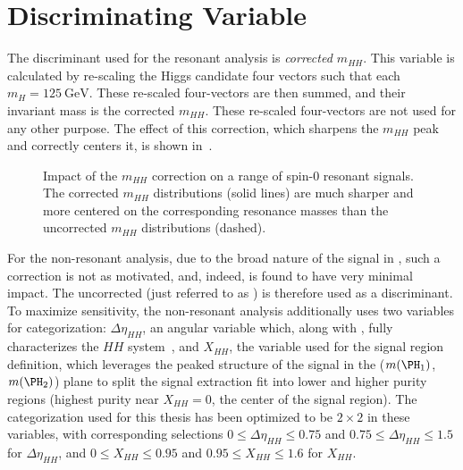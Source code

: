 \section{Discriminating Variable}
\label{subsec:disc-var}

The discriminant used for the resonant analysis is \emph{corrected $m_{HH}$}. This
variable is calculated by re-scaling the Higgs candidate four vectors such that
each $m_{H} = \SI{125}{\GeV}$. These re-scaled four-vectors are then summed, and
their invariant mass is the corrected $m_{HH}$. These re-scaled four-vectors are
not used for any other purpose. The effect of this correction, which sharpens
the $m_{HH}$ peak and correctly centers it, is shown
in~\Fig{\ref{fig:m-hh-cor-effect}}.
\begin{figure}[ht]
\centering
{}
\caption{\label{fig:m-hh-cor-effect} Impact of the $m_{HH}$ correction on a range of spin-0 
resonant signals. The corrected $m_{HH}$ distributions (solid lines) are much sharper and 
more centered on the corresponding resonance masses than the uncorrected $m_{HH}$ distributions 
(dashed).}
\end{figure}

For the non-resonant analysis, due to the broad nature of the signal in \mhh, such a 
correction is not as motivated, and, indeed, is found to have very minimal 
impact. The uncorrected \mhh (just referred to as \mhh) is therefore used 
as a discriminant. To maximize sensitivity, the non-resonant analysis 
additionally uses two variables for categorization: $\Delta \eta_{HH}$, an angular 
variable which, along with \mhh, fully characterizes the $HH$ system~\cite{cosThetastar}, 
and $X_{HH}$, the variable used for the 
signal region definition, which leverages the peaked structure of the 
signal in the ($\mh1$, $\mh2$) plane to split the signal extraction fit into lower and higher
purity regions (highest purity near $X_{HH} = 0$, the center of the signal region). The categorization 
used for this thesis has been optimized to be $2\times 2$ in these variables, with corresponding selections 
$0 \leq \Delta \eta_{HH} \leq 0.75$ and $0.75 \leq \Delta \eta_{HH} \leq 1.5$ for $\Delta \eta_{HH}$, 
and $0 \leq X_{HH} \leq 0.95$ and $0.95 \leq X_{HH} \leq 1.6$ for $X_{HH}$.
